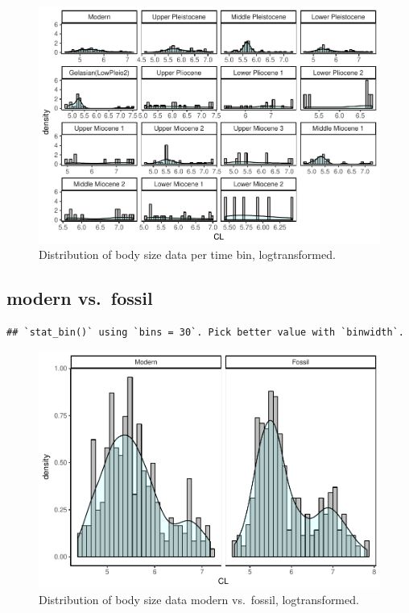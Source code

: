 \documentclass[]{article}
\begin{document}
\begin{figure}[htbp]
\centering
\includegraphics{MA_JJ_files/figure-latex/Histograms of body size data, per time bin-1.pdf}
\caption{Distribution of body size data per time bin, logtransformed.}
\end{figure}

\newpage

\subsection{modern vs.~fossil}\label{modern-vs.fossil}

\begin{verbatim}
## `stat_bin()` using `bins = 30`. Pick better value with `binwidth`.
\end{verbatim}

\begin{figure}[htbp]
\centering
\includegraphics{MA_JJ_files/figure-latex/Histograms of body size data, modern vs. fossil-1.pdf}
\caption{Distribution of body size data modern vs.~fossil,
logtransformed.}
\end{figure}
\end{document}
